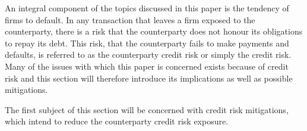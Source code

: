 \documentclass[main.tex]{subfiles}
\begin{document}
    An integral component of the topics discussed in this paper is the tendency of firms to default.
    In any transaction that leaves a firm exposed to the counterparty,
    there is a risk that the counterparty does not honour its obligations to repay its debt.
    This risk, that the counterparty fails to make payments and defaults, 
    is referred to as the counterparty credit risk or simply the credit risk.
    Many of the issues with which this paper is concerned exists because of credit risk 
    and this section will therefore introduce its implications as well as possible mitigations.

    The first subject of this section will be concerned with credit risk mitigations,
    which intend to reduce the counterparty credit risk exposure.
\end{document}
